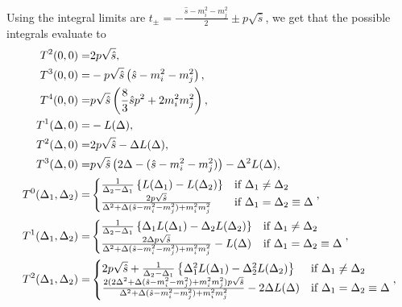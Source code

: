 \documentclass[../main.tex]{subfiles}
\begin{document}
Using the integral limits are \(t_\pm = -\frac{\hat{s} - m_i^2 - m_j^2}{2} \pm p\sqrt{\hat{s}}\), we get that the possible integrals evaluate to
\begin{subequations}
  \begin{align}
    T^2(0, 0) =                         & 2p\sqrt{\hat{s}},
    \\
    T^3(0, 0) =                         &
    -p\sqrt{\hat{s}}\left(\hat{s} - m_i^2 - m_j^2\right),
    \\
    T^4(0, 0) =                         & p\sqrt{\hat{s}}
    \left(\frac{8}{3}\hat{s}p^2 + 2m_i^2m_j^2\right),
    \\
    T^1\!\left(\Delta, 0\right) =          & -L(\Delta),
    \\
    T^2\!\left(\Delta, 0\right) =          & 2p\sqrt{\hat{s}} - \Delta L(\Delta),
    \\
    T^3\!\left(\Delta, 0\right) =          &
    p\sqrt{\hat{s}} \left(2\Delta - (\hat{s}-m_i^2-m_j^2)\right) - \Delta^2 L(\Delta),
    \\
    T^0\!\left(\Delta_1, \Delta_2\right) = & \begin{cases} \frac{1}{\Delta_2 - \Delta_1}
                                            \left\{L(\Delta_1) - L(\Delta_2)\right\}                                           & \text{if } \Delta_1\neq \Delta_2             \\
                                            \frac{2p \sqrt{\hat{s}}}{\Delta^2 + \Delta(\hat{s}-m_i^2-m_j^2) + m_i^2m_j^2} & \text{if } \Delta_1 = \Delta_2 \equiv \Delta\end{cases},
    \\
    T^1\!\left(\Delta_1, \Delta_2\right) = & \begin{cases} \frac{1}{\Delta_2 - \Delta_1}
                                            \left\{\Delta_1 L(\Delta_1) - \Delta_2 L(\Delta_2)\right\}                                            & \text{if } \Delta_1 \neq \Delta_2            \\
                                            \frac{2\Delta p \sqrt{\hat{s}}}{\Delta^2 + \Delta(\hat{s}-m_i^2-m_j^2) + m_i^2m_j^2} - L(\Delta) & \text{if } \Delta_1 = \Delta_2 \equiv \Delta\end{cases},
    \\
    \nonumber
    T^2\!\left(\Delta_1, \Delta_2\right) = & \begin{cases} 2p\sqrt{\hat{s}} +
                                            \frac{1}{\Delta_2 - \Delta_1} \left\{\Delta_1^2 L(\Delta_1) -
                                            \Delta_2^2 L(\Delta_2)\right\}                                                                                                                                  & \text{if } \Delta_1 \neq \Delta_2            \\
                                            \frac{2(2\Delta^2 + \Delta(\hat{s}-m_i^2-m_j^2) + m_i^2m_j^2) p \sqrt{\hat{s}}}{\Delta^2 + \Delta(\hat{s}-m_i^2-m_j^2) + m_i^2m_j^2} - 2\Delta L(\Delta) & \text{if } \Delta_1 = \Delta_2 \equiv \Delta\end{cases},
  \end{align}
\end{subequations}
\end{document}
